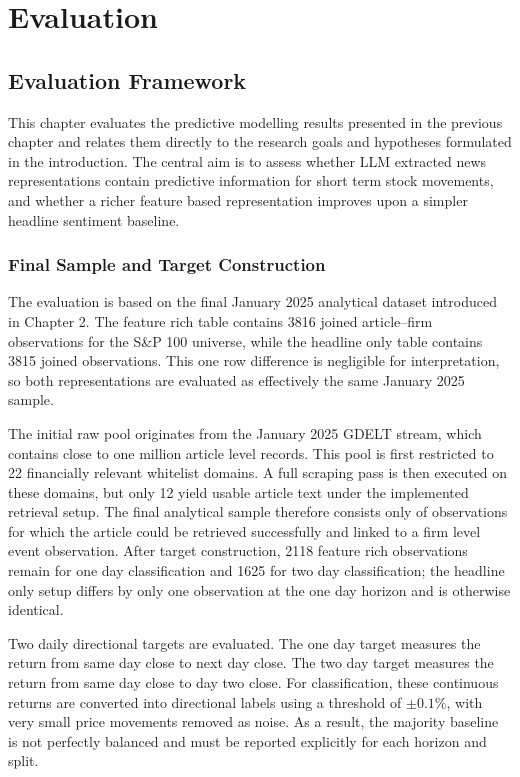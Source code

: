 
\chapter{Evaluation}

\section{Evaluation Framework}

This chapter evaluates the predictive modelling results presented in the previous chapter and relates them directly to the research goals and hypotheses formulated in the introduction. The central aim is to assess whether LLM extracted news representations contain predictive information for short term stock movements, and whether a richer feature based representation improves upon a simpler headline sentiment baseline.

\subsection{Final Sample and Target Construction}

The evaluation is based on the final January 2025 analytical dataset introduced in Chapter 2. The feature rich table contains 3816 joined article--firm observations for the S\&P 100 universe, while the headline only table contains 3815 joined observations. This one row difference is negligible for interpretation, so both representations are evaluated as effectively the same January 2025 sample.

The initial raw pool originates from the January 2025 GDELT stream, which contains close to one million article level records. This pool is first restricted to 22 financially relevant whitelist domains. A full scraping pass is then executed on these domains, but only 12 yield usable article text under the implemented retrieval setup. The final analytical sample therefore consists only of observations for which the article could be retrieved successfully and linked to a firm level event observation. After target construction, 2118 feature rich observations remain for one day classification and 1625 for two day classification; the headline only setup differs by only one observation at the one day horizon and is otherwise identical.

Two daily directional targets are evaluated. The one day target measures the return from same day close to next day close. The two day target measures the return from same day close to day two close. For classification, these continuous returns are converted into directional labels using a threshold of $\pm 0.1\%$, with very small price movements removed as noise. As a result, the majority baseline is not perfectly balanced and must be reported explicitly for each horizon and split.

